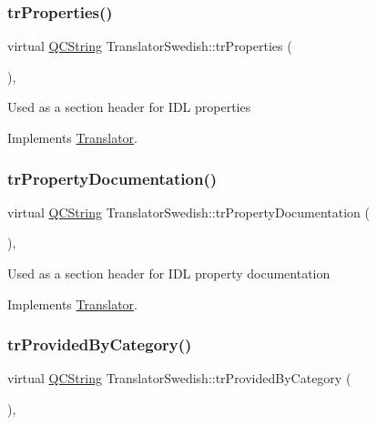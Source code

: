 \subsubsection{\texorpdfstring{trProperties()}{trProperties()}}
{\footnotesize\ttfamily virtual \mbox{\hyperlink{class_q_c_string}{Q\+C\+String}} Translator\+Swedish\+::tr\+Properties (\begin{DoxyParamCaption}{ }\end{DoxyParamCaption})\hspace{0.3cm}{\ttfamily [inline]}, {\ttfamily [virtual]}}

Used as a section header for I\+DL properties 

Implements \mbox{\hyperlink{class_translator}{Translator}}.

\mbox{\label{class_translator_swedish_af169d47ca6c357d0eb4305f533448048}} 
\subsubsection{\texorpdfstring{trPropertyDocumentation()}{trPropertyDocumentation()}}
{\footnotesize\ttfamily virtual \mbox{\hyperlink{class_q_c_string}{Q\+C\+String}} Translator\+Swedish\+::tr\+Property\+Documentation (\begin{DoxyParamCaption}{ }\end{DoxyParamCaption})\hspace{0.3cm}{\ttfamily [inline]}, {\ttfamily [virtual]}}

Used as a section header for I\+DL property documentation 

Implements \mbox{\hyperlink{class_translator}{Translator}}.

\mbox{\label{class_translator_swedish_a76de48d62f940a00871e7d069c2609c8}} 
\subsubsection{\texorpdfstring{trProvidedByCategory()}{trProvidedByCategory()}}
{\footnotesize\ttfamily virtual \mbox{\hyperlink{class_q_c_string}{Q\+C\+String}} Translator\+Swedish\+::tr\+Provided\+By\+Category (\begin{DoxyParamCaption}{ }\end{DoxyParamCaption})\hspace{0.3cm}{\ttfamily [inline]}, {\ttfamily [virtual]}}

